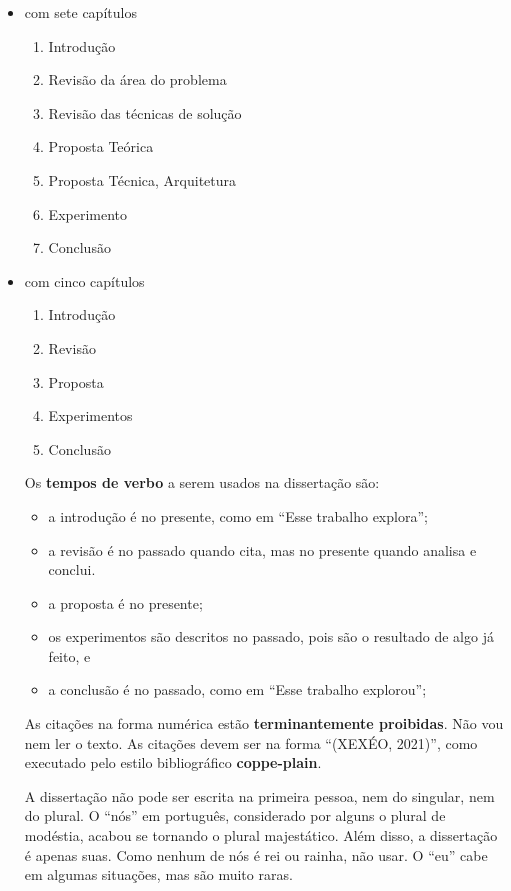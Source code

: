 \documentclass{article}
\begin{document}
\begin{itemize}
    \item com sete capítulos
    \begin{enumerate}
        \item Introdução
        \item Revisão da área do problema
        \item Revisão das técnicas de solução
        \item Proposta Teórica
        \item Proposta Técnica, Arquitetura
        \item Experimento 
        \item Conclusão
    \end{enumerate}
    \item com cinco capítulos
    \begin{enumerate}
        \item Introdução
        \item Revisão
        \item Proposta
        \item Experimentos
        \item Conclusão
    \end{enumerate}



Os \textbf{tempos de verbo} a serem usados na dissertação são:
\begin{itemize}
    \item a introdução é no presente, como em ``Esse trabalho explora'';
    \item a revisão é no passado quando cita, mas no presente quando analisa e conclui.
    \item a proposta é no presente;
    \item os experimentos são descritos no passado, pois são o resultado de algo já feito, e
    \item a conclusão é no passado, como em ``Esse trabalho explorou'';
\end{itemize}

As citações na forma numérica estão \textbf{terminantemente proibidas}. Não vou nem ler o texto. As citações devem ser na forma ``(XEXÉO, 2021)'', como executado pelo estilo bibliográfico \textbf{coppe-plain}.

A dissertação não pode ser escrita na primeira pessoa, nem do singular, nem do plural. O ``nós'' em português, considerado por alguns o plural de modéstia, acabou se tornando o plural majestático. Além disso, a dissertação é apenas suas. Como nenhum de nós é rei ou rainha, não usar. O ``eu'' cabe em algumas situações, mas são muito raras. 


\end{itemize}
\end{document}
